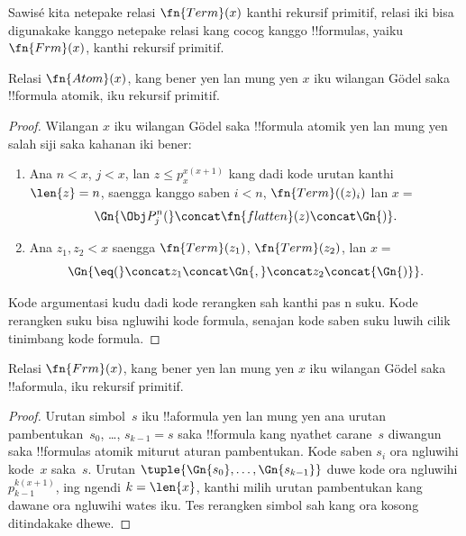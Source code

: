 \documentclass[../../../include/open-logic-section]{subfiles}
\begin{document}

Sawisé kita netepake relasi $\fn{Term}(x)$
kanthi rekursif primitif, relasi iki bisa
digunakake kanggo netepake relasi kang
cocog kanggo !!{formula}s, yaiku
$\fn{Frm}(x)$, kanthi rekursif primitif.

\begin{prop}
Relasi $\fn{Atom}(x)$, kang bener yen lan
mung yen $x$ iku wilangan G\"odel saka
!!{formula} atomik, iku rekursif primitif.
\end{prop}

\begin{proof}
Wilangan $x$ iku wilangan G\"odel saka
!!{formula} atomik yen lan mung yen
salah siji saka kahanan iki bener:
\begin{enumerate}
\item Ana $n < x$, $j < x$, lan $z \le p_x^{x(x+1)}$
  kang dadi kode urutan kanthi $\len{z}=n$, saengga kanggo saben $i < n$,
  $\fn{Term}((z)_i)$ lan $x = $
\[
\Gn{\Obj P^n_j(} \concat \fn{flatten}(z) \concat \Gn{)}.
\]
\item Ana $z_1, z_2 < x$ saengga
  $\fn{Term}(z_1)$, $\fn{Term}(z_2)$,
  lan $x = $
\[
\Gn{{\eq}(} \concat z_1 \concat \Gn{,} \concat z_2 \concat{\Gn{)}}.
\]
\end{enumerate} Kode argumentasi kudu dadi kode rerangken sah kanthi pas n suku. Kode rerangken suku bisa ngluwihi kode formula, senajan kode saben suku luwih cilik tinimbang kode formula.
\end{proof}

\begin{prop}
Relasi $\fn{Frm}(x)$, kang bener yen lan
mung yen $x$ iku wilangan G\"odel saka
!!a{formula}, iku rekursif primitif.
\end{prop}

\begin{proof}
Urutan simbol~$s$ iku !!a{formula} yen lan
mung yen ana urutan pambentukan~$s_0$,
\dots, $s_{k-1} = s$ saka !!{formula}
kang nyathet carane~$s$ diwangun saka
!!{formula}s atomik miturut aturan
pambentukan. Kode saben $s_i$ ora ngluwihi kode~$x$ saka~$s$.
Urutan $\tuple{\Gn{s_0}, \dots, \Gn{s_{k-1}}}$ duwe kode ora ngluwihi
$p_{k-1}^{k(x+1)}$, ing ngendi $k=\len{x}$, kanthi milih urutan pambentukan
kang dawane ora ngluwihi wates iku. Tes rerangken simbol sah kang ora kosong
ditindakake dhewe.
\end{proof}
\end{document}
